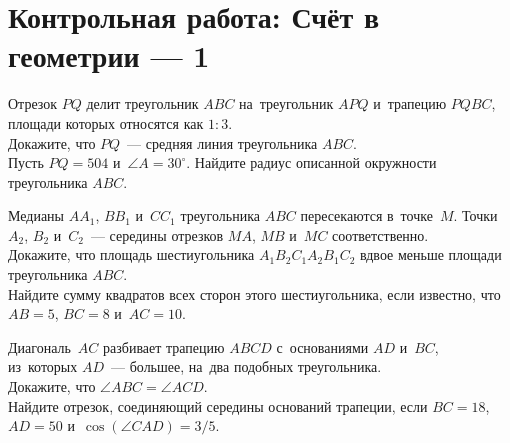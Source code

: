 
\vspace{-1ex}

\section*{Контрольная работа: Счёт в геометрии --- 1}



\vspace{-1ex}

\begin{problems}

\item
Отрезок $PQ$ делит треугольник $ABC$ на~треугольник $APQ$ и~трапецию $PQBC$,
площади которых относятся как $1 : 3$.
\\
\subproblem
Докажите, что $PQ$~--- средняя линия треугольника $ABC$.
\\
\subproblem
Пусть $PQ = 504$ и~$\angle A = 30^{\circ}$.
Найдите радиус описанной окружности треугольника $ABC$.

\item
Медианы $A A_1$, $B B_1$ и~$C C_1$ треугольника $ABC$ пересекаются в~точке~$M$.
Точки $A_2$, $B_2$ и~$C_2$~--- середины отрезков $MA$, $MB$ и~$MC$
соответственно.
\\
\subproblem
Докажите, что площадь шестиугольника $A_1 B_2 C_1 A_2 B_1 C_2$ вдвое меньше
площади треугольника $ABC$.
\\
\subproblem
Найдите сумму квадратов всех сторон этого шестиугольника, если известно, что
$AB = 5$, $BC = 8$ и~$AC = 10$.

\item
Диагональ~$AC$ разбивает трапецию $ABCD$ с~основаниями $AD$ и~$BC$, из~которых
$AD$~--- большее, на~два подобных треугольника.
\\
\subproblem
Докажите, что $\angle ABC = \angle ACD$.
\\
\subproblem
Найдите отрезок, соединяющий середины оснований трапеции, если $BC = 18$,
$AD = 50$ и~$\cos(\angle CAD) = 3/5$.

\end{problems}

